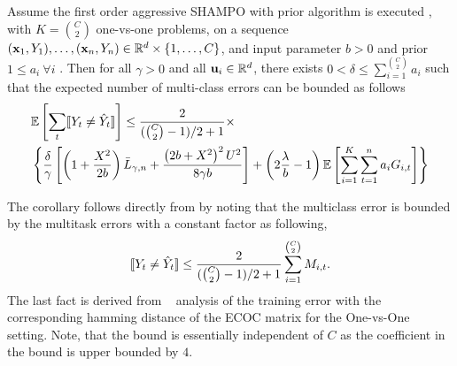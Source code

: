 \begin{corollary}
Assume the first order aggressive SHAMPO with prior algorithm is executed , with $K={C \choose 2}$ one-vs-one problems, 
on a sequence $(\mathbf{x}_1,Y_1),\ldots,(\mathbf{x}_n,Y_n)\in\mathbb{R}^d\times\{1,\ldots,C\}$, and input parameter 
$b>0$ and prior $1\le a_i~\forall i$ . Then for all $\gamma>0$ and all $\mathbf{u}_{i}\in\mathbb{R}^d$, 
there exists $0<\delta\le \sum_{i=1}^{C \choose 2}a_{i}$ such that the expected number of multi-class 
errors can be bounded as follows
 \[
 \begin{split}
 &\mathbb{E}\left[{\sum_t [\![{Y_t \neq \hat{Y}_t}]\!]}\right]\le \frac{2}{({C \choose 2}-1)/2+1}\times\\
 &\left\{{ \frac{\delta}{\gamma}\left[{\left({1+\frac{X^2}{2b} }\right){\bar L}_{\gamma,n}+\frac{\left({{2b+X^2}}\right)^2U^{2}}{8{\gamma}b}}\right]+\left({2\frac{\lambda}{b}-1}\right)\mathbb{E}\left[{\sum_{i=1}^{K}\sum_{t=1}^{n}{a_{i}G_{i,t}}}\right]}\right\}
 \end{split}
 \]

\end{corollary}
The corollary follows directly from  by noting that the  multiclass error 
is bounded by the multitask errors with a constant factor as following, 
\[
[\![{Y_t \neq \hat{Y}_t}]\!] \leq \frac{2}{({C \choose 2}-1)/2+1}\sum_{i=1}^{ {C \choose 2}} M_{i,t}. 
\]
The last fact is derived from ~\cite{allwein2001reducing} analysis of the training error 
with the corresponding hamming distance of the ECOC matrix for the One-vs-One 
setting. Note, that the bound is essentially  independent of $C$ as the coefficient in the bound is upper 
bounded by $4$.

